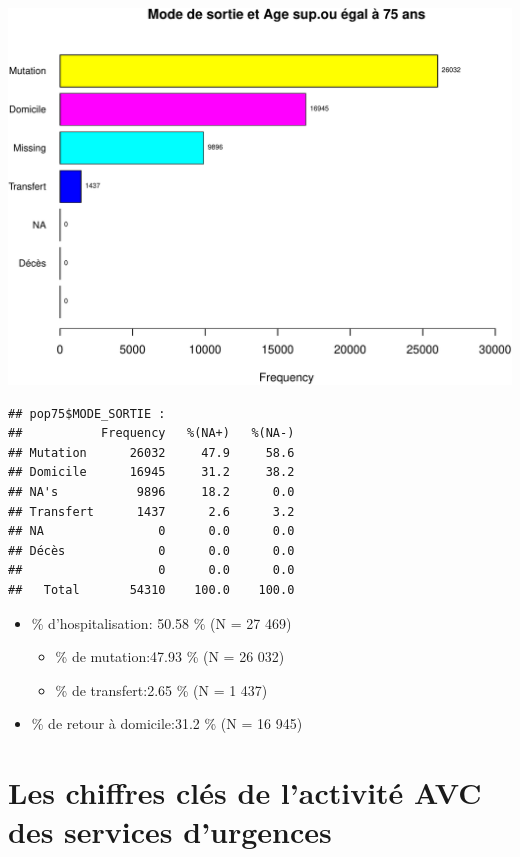 \documentclass[]{article}
\begin{document}
\includegraphics{rapport2014_V4_files/figure-latex/sortie75-1.pdf}

\begin{verbatim}
## pop75$MODE_SORTIE : 
##           Frequency   %(NA+)   %(NA-)
## Mutation      26032     47.9     58.6
## Domicile      16945     31.2     38.2
## NA's           9896     18.2      0.0
## Transfert      1437      2.6      3.2
## NA                0      0.0      0.0
## Décès             0      0.0      0.0
##                   0      0.0      0.0
##   Total       54310    100.0    100.0
\end{verbatim}

\begin{itemize}
\itemsep1pt\parskip0pt
\item
  \% d'hospitalisation: 50.58 \% (N = 27 469)

  \begin{itemize}
  \itemsep1pt\parskip0pt
  \item
    \% de mutation:47.93 \% (N = 26 032)
  \item
    \% de transfert:2.65 \% (N = 1 437)
  \end{itemize}
\item
  \% de retour à domicile:31.2 \% (N = 16 945)
\end{itemize}

\section{Les chiffres clés de l'activité AVC des services
d'urgences}\label{les-chiffres-cles-de-lactivite-avc-des-services-durgences}
\end{document}

